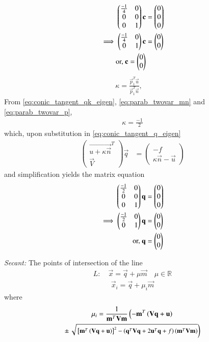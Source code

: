 \documentclass[journal,12pt,twocolumn]{IEEEtran}
\begin{document}
\begin{align}
\begin{pmatrix}\frac{-1}{4} & 0 \\ 0 & 0 \\ 0 & 1\end{pmatrix}\mathbf{c} &= \begin{pmatrix}0 \\ 0\\0\end{pmatrix} 
\\
\implies 
\begin{pmatrix}\frac{-1}{4} & 0 \\  0 & 1\end{pmatrix}\mathbf{c} &= \begin{pmatrix}0 \\ 0\end{pmatrix} 
\\
\text{or, } \mathbf{c} = \begin{pmatrix}0\\0\end{pmatrix}
\end{align}
\begin{align}
\label{eq:conic_tangent_qk_eigen} \kappa = \frac{\vec{p}_1^T\vec{u}}{\vec{p}_1^T\vec{n}}, \quad 
\end{align}
From \eqref{eq:conic_tangent_qk_eigen}, \eqref{eq:parab_twovar_mn} and \eqref{eq:parab_twovar_p},
\begin{align}
\kappa =\frac{-1}{2}
\end{align}
which, upon substitution in  \eqref{eq:conic_tangent_q_eigen}
\begin{align}
\label{eq:conic_tangent_q_eigen}
\begin{pmatrix}
\vec{u+\kappa \vec{n}}^T \\ \vec{V}
\end{pmatrix}
\vec{q} &= 
\begin{pmatrix}
-f
\\
\kappa\vec{n}-\vec{u}
\end{pmatrix}
\end{align}
and simplification yields the matrix equation
\begin{align}
\begin{pmatrix}\frac{-1}{2} & 0 \\0 & 0\\0&1\end{pmatrix}\mathbf{q} &= \begin{pmatrix}0\\0\\0\end{pmatrix}
\\
\implies \begin{pmatrix}\frac{-1}{2} & 0\\0&1\end{pmatrix}\mathbf{q} &= \begin{pmatrix}0\\0\end{pmatrix}
\\
\text{or, } \mathbf{q} &= \begin{pmatrix}0 \\0\end{pmatrix}
\end{align}
\item 
{\em Secant: }The points of intersection of the line 
\begin{align}
L: \quad \vec{x} = \vec{q} + \mu \vec{m} \quad \mu \in \mathbb{R}
\label{eq:conic_tangent}
\end{align}
\begin{align}\label{eq:parametricform}
\vec{x}_i = \vec{q} + \mu_i \vec{m}
\end{align}
%
where
\begin{multline}
\mu_i = \frac{1}
{
\mathbf{m}^T\mathbf{V}\mathbf{m}
}
\left(-\mathbf{m}^T\left(\mathbf{V}\mathbf{q}+\mathbf{u}\right)\right.
\\
\pm
{\small
\ensuremath{\left.\sqrt{
{}\left[
\mathbf{m}^T\left(\mathbf{V}\mathbf{q}+\mathbf{u}\right)
\right]^2
-
\left(
\mathbf{q}^T\mathbf{V}\mathbf{q} + 2\mathbf{u}^T\mathbf{q} +f
\right)
\left(\mathbf{m}^T\mathbf{V}\mathbf{m}\right)
}
\right)}
}
\label{eq:tangent_roots}
\end{multline}
                    
\end{document}
